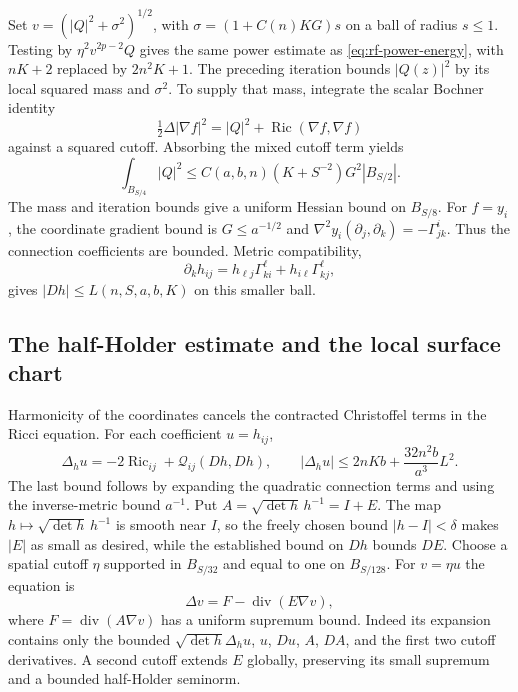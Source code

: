 Set $v=(|Q|^2+\sigma^2)^{1/2}$, with
$\sigma=(1+C(n)KG)s$ on a ball of radius $s\leq1$.
Testing by $\eta^2v^{2p-2}Q$ gives the same power estimate as
\eqref{eq:rf-power-energy}, with $nK+2$ replaced by
$2n^2K+1$.  The preceding iteration bounds $|Q(z)|^2$ by
its local squared mass and $\sigma^2$.  To supply that mass,
integrate the scalar Bochner identity
\[
 \tfrac12\Delta|\nabla f|^2
       =|Q|^2+\operatorname{Ric}(\nabla f,\nabla f)
\]
against a squared cutoff.  Absorbing the mixed cutoff term yields
\[
 \int_{B_{S/4}}|Q|^2
     \leq C(a,b,n)(K+S^{-2})G^2|B_{S/2}|.
\]
The mass and iteration bounds give a uniform Hessian bound on
$B_{S/8}$.  For $f=y_i$, the coordinate gradient bound is
$G\leq a^{-1/2}$ and
$\nabla^2 y_i(\partial_j,\partial_k)=-\Gamma^i_{jk}$.
Thus the connection coefficients are bounded.  Metric
compatibility,
\[
 \partial_k h_{ij}
       =h_{\ell j}\Gamma^\ell_{ki}
                          +h_{i\ell}\Gamma^\ell_{kj},
\]
gives $|Dh|\leq L(n,S,a,b,K)$ on this smaller ball.

\subsection{The half-Holder estimate and the local surface chart}

Harmonicity of the coordinates cancels the contracted Christoffel
terms in the Ricci equation.  For each coefficient $u=h_{ij}$,
\[
 \Delta_h u=-2\operatorname{Ric}_{ij}+\mathcal Q_{ij}(Dh,Dh),
 \qquad
 |\Delta_hu|\leq2nKb+\frac{32n^2b}{a^3}L^2.
\]
The last bound follows by expanding the quadratic connection
terms and using the inverse-metric bound $a^{-1}$.  Put
$A=\sqrt{\det h}\,h^{-1}=I+E$.
The map $h\mapsto\sqrt{\det h}\,h^{-1}$ is smooth near $I$,
so the freely chosen bound $|h-I|<\delta$ makes $|E|$ as small
as desired, while the established bound on $Dh$ bounds $DE$.
Choose a spatial cutoff $\eta$ supported in $B_{S/32}$ and
equal to one on $B_{S/128}$.  For $v=\eta u$ the equation is
\[
 \Delta v=F-\operatorname{div}(E\nabla v),
\]
where $F=\operatorname{div}(A\nabla v)$ has a uniform supremum
bound.  Indeed its expansion contains only the bounded
$\sqrt{\det h}\Delta_hu$, $u$, $Du$, $A$, $DA$, and the first
two cutoff derivatives.  A second cutoff extends $E$ globally,
preserving its small supremum and a bounded half-Holder seminorm.

